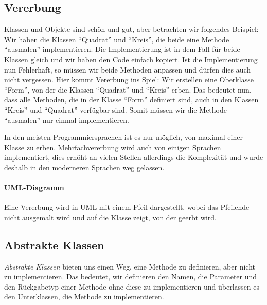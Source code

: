 \subsection{Vererbung} \imperativeMark \oopMark
	Klassen und Objekte sind schön und gut, aber betrachten wir folgendes Beispiel: Wir haben die Klassen \enquote{Quadrat} und \enquote{Kreis}, die beide eine Methode \enquote{ausmalen} implementieren. Die Implementierung ist in dem Fall für beide Klassen gleich und wir haben den Code einfach kopiert. Ist die Implementierung nun Fehlerhaft, so müssen wir beide Methoden anpassen und dürfen dies auch nicht vergessen. Hier kommt Vererbung ins Spiel: Wir erstellen eine Oberklasse \enquote{Form}, von der die Klassen \enquote{Quadrat} und \enquote{Kreis} erben. Das bedeutet nun, dass alle Methoden, die in der Klasse \enquote{Form} definiert sind, auch in den Klassen \enquote{Kreis} und \enquote{Quadrat} verfügbar sind. Somit müssen wir die Methode \enquote{ausmalen} nur einmal implementieren.
	
	In den meisten Programmiersprachen ist es nur möglich, von maximal einer Klasse zu erben. Mehrfachvererbung wird auch von einigen Sprachen implementiert, dies erhöht an vielen Stellen allerdings die Komplexität und wurde deshalb in den moderneren Sprachen weg gelassen.
	
	\paragraph{UML-Diagramm}
		Eine Vererbung wird in UML mit einem Pfeil dargestellt, wobei das Pfeilende nicht ausgemalt wird und auf die Klasse zeigt, von der geerbt wird.
		\begin{figure}[H]
			\centering
		\end{figure}

\subsection{Abstrakte Klassen} \imperativeMark \oopMark
	\textit{Abstrakte Klassen} bieten uns einen Weg, eine Methode zu definieren, aber nicht zu implementieren. Das bedeutet, wir definieren den Namen, die Parameter und den Rückgabetyp einer Methode ohne diese zu implementieren und überlassen es den Unterklassen, die Methode zu implementieren.
	
